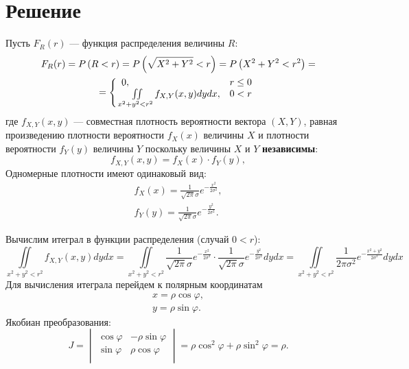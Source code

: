 \section*{Решение}
Пусть $F_R(r)$ --- функция распределения величины $R$:
\begin{multline}
    F_R(r)
    = P \left ( R < r \right )
    = P \left ( \sqrt{X^2 + Y^2} < r \right )
    = P \left ( X^2 + Y^2 < r^2 \right ) = \\
    = \left \{
    \begin{array}{ll}
        0,                                                   & r \le 0 \\
        \iint \limits_{x^2 + y^2 < r^2} f_{X,Y}(x, y) dy dx, & 0 < r   \\
    \end{array}
    \right .
\end{multline}
где $f_{X,Y}(x, y)$ --- совместная плотность вероятности вектора $\left ( X, Y \right )$, равная произведению плотности вероятности $f_X(x)$ величины $X$ и
плотности вероятности $f_Y(y)$ величины $Y$ поскольку величины $X$ и $Y$ \textbf{независимы}:
\begin{equation}
    f_{X,Y}(x, y) = f_X(x) \cdot f_Y(y),
\end{equation}
Одномерные плотности имеют одинаковый вид:
\begin{gather}
    f_X(x) = \frac{1}{\sqrt{2 \pi} \sigma} e^{- \frac{x^2}{2 \sigma^2}} , \\
    f_Y(y) = \frac{1}{\sqrt{2 \pi} \sigma} e^{- \frac{y^2}{2 \sigma^2}} .
\end{gather}

Вычислим итеграл в функции распределения (случай $0 < r$):
\begin{equation}
    \iint \limits_{x^2 + y^2 < r^2} f_{X,Y}(x, y) dy dx
    = \iint \limits_{x^2 + y^2 < r^2} \frac{1}{\sqrt{2 \pi} \sigma} e^{- \frac{x^2}{2 \sigma^2}} \cdot \frac{1}{\sqrt{2 \pi} \sigma} e^{- \frac{y^2}{2 \sigma^2}} dy dx
    = \iint \limits_{x^2 + y^2 < r^2} \frac{1}{2 \pi \sigma^2} e^{- \frac{x^2 + y^2}{2 \sigma^2}} dy dx
\end{equation}
Для вычисления итеграла перейдем к полярным координатам
\begin{gather}
    x = \rho \cos \varphi , \\
    y = \rho \sin \varphi .
\end{gather}
Якобиан преобразования:
\begin{equation}
    J
    = \begin{vmatrix}
          \cos \varphi & - \rho \sin \varphi \\
          \sin \varphi & \rho \cos \varphi   \\
    \end{vmatrix}
    = \rho \cos^2 \varphi + \rho \sin^2 \varphi = \rho
    .
\end{equation}

